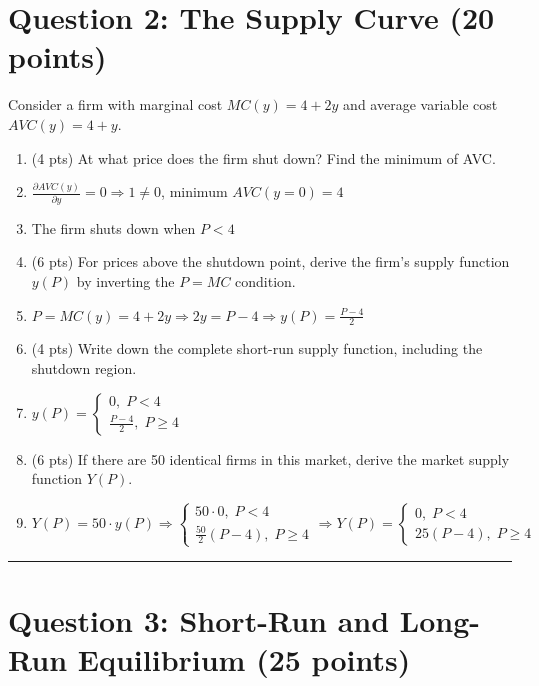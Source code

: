 \documentclass[11pt]{article}
\begin{document}
\section*{Question 2: The Supply Curve (20 points)}

Consider a firm with marginal cost $MC(y) = 4 + 2y$ and average variable cost $AVC(y) = 4 + y$.

\begin{enumerate}[label=(\alph*)]
    \item (4 pts) At what price does the firm shut down? Find the minimum of AVC.
    \item[] $\frac{\partial AVC(y)}{\partial y}=0\Rightarrow1\neq0$, minimum $AVC(y=0)=4$
    \item[] The firm shuts down when $P<4$
    
    \item (6 pts) For prices above the shutdown point, derive the firm's supply function $y(P)$ by inverting the $P = MC$ condition.
    \item[] $P=MC(y)=4+2y\Rightarrow 2y=P-4\Rightarrow y(P)=\frac{P-4}{2}$
    
    \item (4 pts) Write down the complete short-run supply function, including the shutdown region.
    \item[] $y(P)= \begin{cases}
        0,\; P<4 \\ \frac{P-4}{2},\; P\geq 4
    \end{cases}$
    
    \item (6 pts) If there are 50 identical firms in this market, derive the market supply function $Y(P)$.
    \item[] $Y(P)=50\cdot y(P)\Rightarrow\begin{cases}
        50\cdot 0,\; P<4\\ \frac{50}{2}(P-4),\; P\geq 4
    \end{cases}\Rightarrow Y(P)=\begin{cases}
        0,\; P<4\\ 25(P-4),\; P\geq 4
    \end{cases}$
\end{enumerate}

\vspace{0em}
\noindent\rule{\textwidth}{0.4pt}

\section*{Question 3: Short-Run and Long-Run Equilibrium (25 points)}
\end{document}
